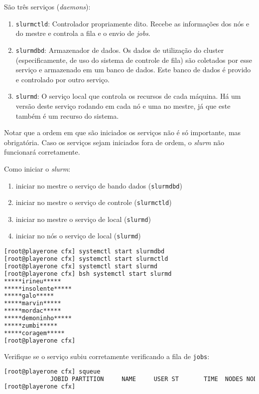 São três serviços (\textit{daemons}):

\begin{enumerate}
\item \texttt{slurmctld}: Controlador propriamente dito. Recebe as informações dos nós e do mestre e controla
  a fila e o envio de \textit{jobs}.
  \item \texttt{slurmdbd}: Armazenador de dados. Os dados de utilização do cluster (especificamente, de uso do sistema de controle de fila) são coletados por esse serviço e armazenado em um banco de dados. Este banco de dados é provido e controlado por outro serviço.
  \item \texttt{slurmd}: O serviço local que controla os recursos de cada máquina. Há um versão deste serviço rodando em cada nó e uma no mestre, já que este também é um recurso do sistema.
\end{enumerate}

Notar que a ordem em que são iniciados os serviços não é só importante, mas obrigatória. Caso os serviços
sejam iniciados fora de ordem, o \textit{slurm} não funcionará corretamente.

Como iniciar o \textit{slurm}: %

\begin{enumerate}
\item iniciar no mestre o serviço de bando dados (\texttt{slurmdbd})
\item iniciar no mestre o serviço de controle (\texttt{slurmctld})
\item iniciar no mestre o serviço de local (\texttt{slurmd})
\item iniciar no nós o serviço de local (\texttt{slurmd})
\end{enumerate}

\begin{lstlisting}[language=bash,basicstyle=\small]
[root@playerone cfx] systemctl start slurmdbd
[root@playerone cfx] systemctl start slurmctld
[root@playerone cfx] systemctl start slurmd
[root@playerone cfx] bsh systemctl start slurmd
*****irineu*****
*****insolente*****
*****galo*****
*****marvin*****
*****mordac*****
*****demoninho*****
*****zumbi*****
*****coragem*****
[root@playerone cfx]
\end{lstlisting}

Verifique se o serviço subiu corretamente verificando a fila de \texttt{jobs}:

\begin{lstlisting}[language=bash,basicstyle=\small]
[root@playerone cfx] squeue 
             JOBID PARTITION     NAME     USER ST       TIME  NODES NODELIST(REASON)
[root@playerone cfx] 
\end{lstlisting}


